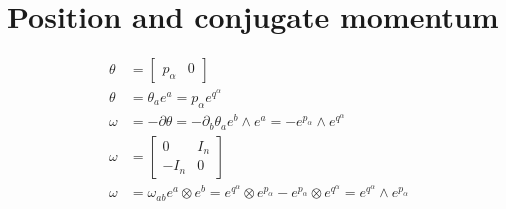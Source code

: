 \documentclass[11pt]{article}
\begin{document}
\section{Position and conjugate momentum}

\begin{equation}
\begin{aligned}
\theta &= \left[ \begin{matrix}
p_\alpha & 0 \end{matrix} \right] \\
\theta &= \theta_a e^a = p_\alpha e^{q^\alpha} \\
\omega &= - \partial \theta = - \partial_b \theta_a e^b \wedge e^a = - e^{p_\alpha} \wedge e^{q^\alpha}  \\
\omega &= \left[ \begin{matrix}
0 & I_n \\[2.2ex]
- I_n & 0 \end{matrix} \right] \\
\omega &= \omega_{ab} e^a \otimes e^b = e^{q^\alpha} \otimes e^{p_\alpha} - e^{p_\alpha} \otimes e^{q^\alpha} = e^{q^\alpha} \wedge e^{p_\alpha} \\
\end{aligned}
\end{equation}
\end{document}
